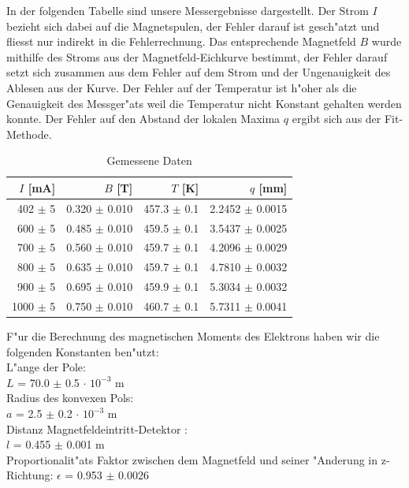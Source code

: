 \documentclass[a4paper,parskip,11pt, DIV12]{scrreprt}
\begin{document}
In der folgenden Tabelle sind unsere Messergebnisse dargestellt. Der Strom $I$ bezieht sich dabei auf die Magnetspulen, der Fehler darauf ist gesch"atzt und fliesst nur indirekt in die Fehlerrechnung. Das entsprechende Magnetfeld $B$ wurde mithilfe des Stroms aus der Magnetfeld-Eichkurve bestimmt, der Fehler darauf setzt sich zusammen aus dem Fehler auf dem Strom und der Ungenauigkeit des Ablesen aus der Kurve. Der Fehler auf der Temperatur ist h"oher als die Genauigkeit des Messger"ats weil die Temperatur nicht Konstant gehalten werden konnte. Der Fehler auf den Abstand der lokalen Maxima $q$ ergibt sich aus der Fit-Methode.
\begin{table}[H]
\centering
\renewcommand{\arraystretch}{1.2} %
\setlength{\tabcolsep}{3mm} %
\begin{tabular}{r|r|r|r}
$I$ [mA] & $B$ [T] & $T$ [K]  & $q$ [mm]\\ \hline
402   $\pm$ 5      & 0.320   $\pm$ 0.010   & 457.3  $\pm$ 0.1   & 2.2452 $\pm$ 0.0015 \\
600    $\pm$ 5      & 0.485   $\pm$ 0.010   & 459.5  $\pm$ 0.1   &3.5437  $\pm$ 0.0025\\
700    $\pm$ 5      & 0.560   $\pm$ 0.010  & 459.7   $\pm$ 0.1   &4.2096  $\pm$ 0.0029\\
800    $\pm$ 5     & 0.635    $\pm$ 0.010 & 459.7    $\pm$ 0.1   & 4.7810 $\pm$  0.0032 \\
900    $\pm$ 5     & 0.695    $\pm$ 0.010 & 459.9    $\pm$ 0.1    &5.3034  $\pm$  0.0032 \\
1000    $\pm$ 5    & 0.750     $\pm$ 0.010 & 460.7       $\pm$ 0.1 &5.7311  $\pm$ 0.0041
\end{tabular}
\caption[Daten]{Gemessene Daten}
\end{table} 
F"ur die Berechnung des magnetischen Moments des Elektrons haben wir die folgenden Konstanten ben"utzt:\\


L"ange der Pole:\\
$L$ = 70.0 $\pm$ 0.5 $\cdot$ $10^{-3}$ m\\
Radius des konvexen Pols:\\
$a$ = 2.5 $\pm$ 0.2 $\cdot$ $10^{-3}$ m\\
Distanz Magnetfeldeintritt-Detektor :\\
$l$ = 0.455 $\pm$ 0.001 m\\
Proportionalit"ats Faktor zwischen dem Magnetfeld und seiner "Anderung in z-Richtung:
$\epsilon$ = 0.953 $\pm$ 0.0026\\
\end{document}
